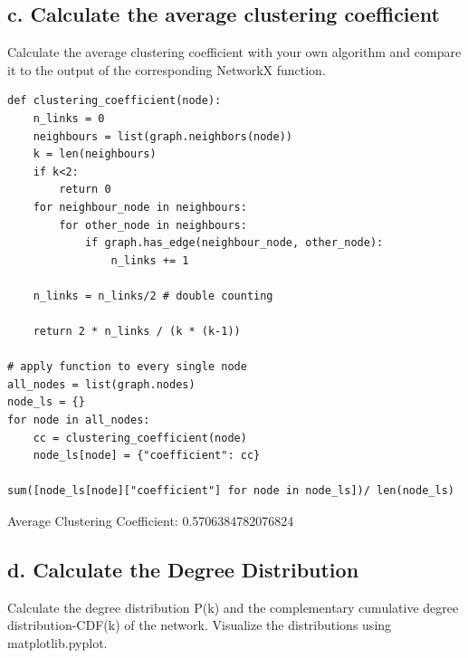 \documentclass[a4paper,12pt]{article}
\begin{document}
\subsection*{c. Calculate the average clustering coefficient}
Calculate the average clustering coefficient with your own algorithm and compare it to the output of the corresponding NetworkX function.
\begin{lstlisting}
def clustering_coefficient(node):
    n_links = 0
    neighbours = list(graph.neighbors(node))
    k = len(neighbours)
    if k<2:
        return 0
    for neighbour_node in neighbours:
        for other_node in neighbours:
            if graph.has_edge(neighbour_node, other_node):
                n_links += 1
    
    n_links = n_links/2 # double counting

    return 2 * n_links / (k * (k-1))
    
# apply function to every single node
all_nodes = list(graph.nodes)
node_ls = {}
for node in all_nodes:
    cc = clustering_coefficient(node)
    node_ls[node] = {"coefficient": cc}
    
sum([node_ls[node]["coefficient"] for node in node_ls])/ len(node_ls) 
\end{lstlisting}
Average Clustering Coefficient:  0.5706384782076824

\subsection*{d. Calculate the Degree Distribution}
Calculate the degree distribution P(k) and the complementary cumulative degree distribution-CDF(k) of the network. Visualize the distributions using matplotlib.pyplot. 
\end{document}
